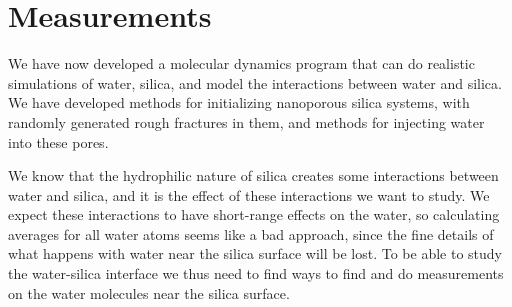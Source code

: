 \chapter{Measurements}
%
%
We have now developed a molecular dynamics program that can do realistic simulations of water, silica, and model the interactions between water and silica. We have developed methods for initializing nanoporous silica systems, with randomly generated rough fractures in them, and methods for injecting water into these pores.

We know that the hydrophilic nature of silica creates some interactions between water and silica, and it is the effect of these interactions we want to study. We expect these interactions to have short-range effects on the water, so calculating averages for all water atoms seems like a bad approach, since the fine details of what happens with water near the silica surface will be lost. To be able to study the water-silica interface we thus need to find ways to find and do measurements on the water molecules near the silica surface.










%     
% 

